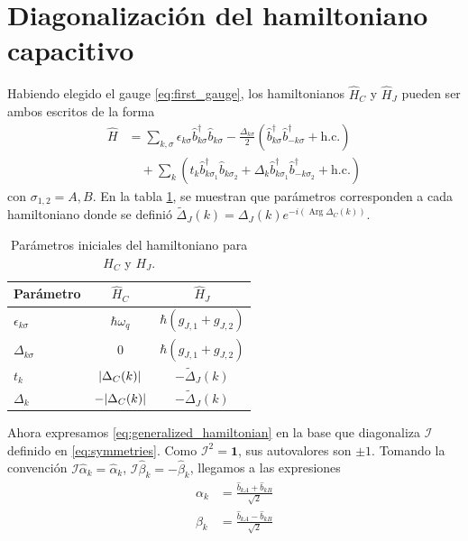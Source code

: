\section{Diagonalización del hamiltoniano capacitivo}
Habiendo elegido el gauge \eqref{eq:first_gauge}, los hamiltonianos $\hat H_C$ y $\hat H_J$ pueden ser ambos escritos de la forma 
\begin{align}
  \hat H &= \sum_{k,\sigma}
                \epsilon_{k\sigma} \hat b^\dag_{k\sigma}\hat b_{k\sigma} 
                - \frac{\Delta_{k\sigma}}{2}\left(\hat b^\dag_{k\sigma}\hat b^\dag_{-k\sigma} + \text{h.c.}\right) \nonumber\\
               &\quad +\sum_{k}\left(t_k\hat b^\dag_{k\sigma_1} \hat b_{k\sigma_2} +\Delta_k\hat b^\dag_{k\sigma_1}\hat b_{-k\sigma_2}^\dag+ \text{h.c.}\right)\label{eq:generalized_hamiltonian}
\end{align}
con $\sigma_{1,2} = A, B$. En la tabla \ref{tab:parametros}, se muestran que parámetros corresponden a cada hamiltoniano donde se definió $\tilde{\Delta}_J(k) = \Delta_J(k)e^{-i\left(\operatorname{Arg}\Delta_C(k)\right)}$.
\begin{table}[h]
\centering
\caption{Parámetros iniciales del hamiltoniano para $H_C$ y $H_J$.}
\label{tab:parametros}
\begin{ruledtabular}
\begin{tabular}{lcc}
Parámetro & $\hat H_C$ & $\hat H_J$ \\
\hline
$\epsilon_{k\sigma}$ & $\hbar\omega_q$ & $\hbar(g_{J,1}+g_{J,2})$ \\
$\Delta_{k\sigma}$ & $0$ & $\hbar(g_{J,1}+g_{J,2})$ \\
$t_k$ & $\abs{\Delta_C(k)}$ & $-\tilde{\Delta}_J(k)$ \\
$\Delta_k$ & $-\abs{\Delta_C(k)}$ & $-\tilde{\Delta}_J(k)$ \\
\end{tabular}
\end{ruledtabular}
\end{table}
Ahora expresamos \eqref{eq:generalized_hamiltonian} en la base que diagonaliza $\mathcal{I}$ definido en \eqref{eq:symmetries}. Como $\mathcal I^2 = \mathbf{1}$, sus autovalores son $\pm 1$. Tomando la convención $\mathcal{I} \hat \alpha_{k} = \hat \alpha_{k}$, $\mathcal{I} \hat \beta_{k} = -\hat \beta_{k}$, llegamos a las expresiones
\begin{subequations}
  \begin{align}
    \alpha_k &= \frac{\hat b_{kA} + \hat b_{kB}}{\sqrt{2}}\\
    \beta_k &= \frac{\hat b_{kA} - \hat b_{kB}}{\sqrt{2}}
  \end{align}\label{eq:alpha_beta}
\end{subequations}
